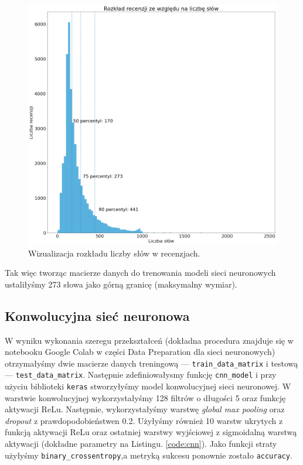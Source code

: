 \begin{figure}[H]
	\centering
	\includegraphics[width=0.75\linewidth]{images/chapter3/w2v-percentyle.pdf}
	\caption{Wizualizacja rozkładu liczby słów w recenzjach.}
	\label{fig:w2v-percentyle}
\end{figure}

\noindent Tak więc tworząc macierze danych do trenowania modeli sieci neuronowych ustaliłyśmy 273 słowa jako górną granicę (maksymalny wymiar).

\subsection{Konwolucyjna sieć neuronowa}

\noindent W wyniku wykonania szeregu przekształceń (dokładna procedura znajduje się w notebooku Google Colab w części Data Preparation dla sieci neuronowych) otrzymałyśmy dwie macierze danych treningową --- \verb|train_data_matrix| i testową --- \verb|test_data_matrix|.
Następnie zdefiniowałysmy funkcję \verb|cnn_model| i przy użyciu biblioteki \verb|keras| stworzyłyśmy model konwolucyjnej sieci neuronowej. W warstwie konwolucyjnej wykorzystałyśmy 128 filtrów o długości 5 oraz funkcję aktywacji ReLu. Następnie, wykorzystałyśmy warstwę \textit{global max pooling} oraz \textit{dropout} z prawdopodobieństwen 0.2.  Użyłyśmy również 10 warstw ukrytych z funkcją aktywacji ReLu oraz ostatniej warstwy wyjściowej z sigmoidalną warstwą aktywacji (dokładne parametry na Listingu. \ref{code:cnn}). Jako funkcji straty użyłyśmy \verb|binary_crossentropy|,a metryką sukcesu ponownie zostało \verb|accuracy|.

